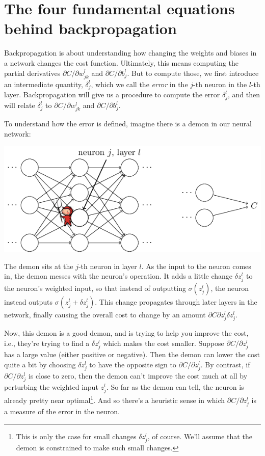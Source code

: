 \documentclass[a4paper,twoside,10pt]{book}
\begin{document}
\section{The four fundamental equations behind backpropagation}
\label{sec:2.4}
Backpropagation is about understanding how changing the weights and biases in a network changes the cost function. Ultimately, this means computing the partial derivatives $\partial{}C/\partial{}w^l_{jk}$ and $\partial{}C/\partial{}b^l_j$. But to compute those, we first introduce an intermediate quantity, $\delta^l_j$, which we call the \textit{error} in the $j$-th neuron in the $l$-th layer. Backpropagation will give us a procedure to compute the error $\delta^l_j$, and then will relate $\delta^l_j$ to $\partial{}C/\partial{}w^l_{jk}$ and $\partial{}C/\partial{}b^l_j$.

To understand how the error is defined, imagine there is a demon in our neural network:

\begin{center}
	\includegraphics[width=0.6\linewidth]{./figures/ch2/tikz19}
\end{center}
The demon sits at the $j$-th neuron in layer $l$. As the input to the neuron comes in, the demon messes with the neuron's operation. It adds a little change $\delta{}z^l_j$ to the neuron's weighted input, so that instead of outputting $\sigma(z^l_j)$, the neuron instead outputs $\sigma(z^l_j+\delta{}z^l_j)$. This change propagates through later layers in the network, finally causing the overall cost to change by an amount $\partial{}C\partial{}z^l_j\delta{}z^l_j$.

Now, this demon is a good demon, and is trying to help you improve the cost, i.e., they're trying to find a $\delta{}z^l_j$ which makes the cost smaller. Suppose $\partial{}C/\partial{}z^l_j$ has a large value (either positive or negative). Then the demon can lower the cost quite a bit by choosing $\delta{}z^l_j$ to have the opposite sign to $\partial{}C/\partial{}z^l_j$. By contrast, if $\partial{}C/\partial{}z^l_j$ is close to zero, then the demon can't improve the cost much at all by perturbing the weighted input $z^l_j$. So far as the demon can tell, the neuron is already pretty near optimal\footnote{This is only the case for small changes $\delta{}z^l_j$, of course. We'll assume that the demon is constrained to make such small changes.}. And so there's a heuristic sense in which $\partial{}C/\partial{}z^l_j$ is a measure of the error in the neuron.
\end{document}
